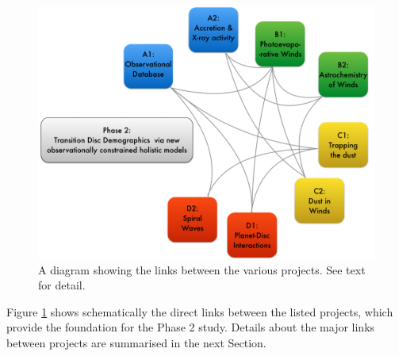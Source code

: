 \documentclass[10pt,fleqn,twoside]{article}
\begin{document}
\begin{figure}
\centerline{\includegraphics[width=13cm]{figures/dependency2.jpg}}
\caption{\label{fig-diagram-links}A diagram showing the links between the various
projects. See text for detail. }
\end{figure}

Figure \ref{fig-diagram-links} shows schematically the direct links between
the listed projects, which provide the foundation for the Phase 2
study.  Details about the major links between
projects are summarised in the next Section.\\

%
\end{document}
